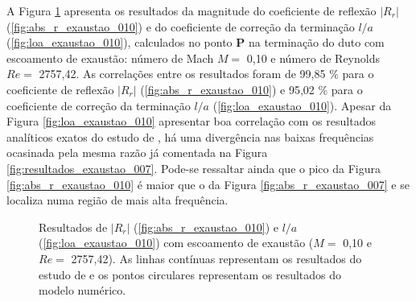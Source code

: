 \newpage
A Figura \ref{fig:resultados_exaustao_010} apresenta os resultados da magnitude do coeficiente de reflexão $|R_{r}|$ (\ref{fig:abs_r_exaustao_010}) e do coeficiente de correção da terminação $l/a$ (\ref{fig:loa_exaustao_010}), calculados no ponto $\textbf{P}$ na terminação do duto com escoamento de exaustão: número de Mach $M =$ 0,10 e número de Reynolds $Re =$ 2757,42.  As correlações entre os resultados foram de 99,85 \% para o coeficiente de reflexão $|R_{r}|$ (\ref{fig:abs_r_exaustao_010}) e 95,02 \% para o coeficiente de correção da terminação $l/a$ (\ref{fig:loa_exaustao_010}). Apesar da Figura \ref{fig:loa_exaustao_010} apresentar boa correlação com os resultados analíticos exatos do estudo de , há uma divergência nas baixas frequências ocasinada pela mesma razão já comentada na Figura \ref{fig:resultados_exaustao_007}. Pode-se ressaltar ainda que o pico da Figura \ref{fig:abs_r_exaustao_010} é maior que o da Figura \ref{fig:abs_r_exaustao_007} e se localiza numa região de mais alta frequência.

\begin{figure}[ht!]
\begin{subfigure}{\scaleA \textwidth}
  
\end{subfigure}%
\begin{subfigure}{\scaleA \textwidth}
  
\end{subfigure}
\caption[Resultados de $|R_{r}|$ e $l/a$ com escoamento de exaustão ($M =$ 0,10 e $Re =$ 2757,42)]{Resultados de $|R_{r}|$ (\ref{fig:abs_r_exaustao_010}) e $l/a$ (\ref{fig:loa_exaustao_010}) com escoamento de exaustão ($M =$ 0,10 e $Re =$ 2757,42). As linhas contínuas representam os resultados do estudo de  e os pontos circulares representam os resultados do modelo numérico.}
\label{fig:resultados_exaustao_010}
\end{figure}

